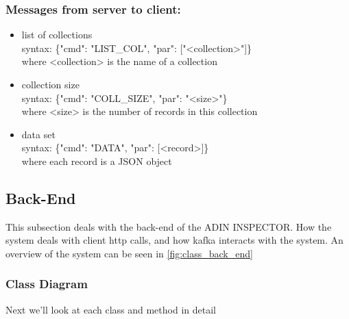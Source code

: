 \documentclass[oneside, english, final]{design}
\begin{document}
\subsubsection{Messages from server to client:}
\begin{itemize}
	\item{list of collections}
	      \\
	      syntax: \{"cmd": "LIST\_COL", "par": ["<collection>"]\} \\
	      where <collection> is the name of a collection\\

	\item{collection size}
	      \\
	      syntax: \{"cmd": "COLL\_SIZE", "par": "<size>"\} \\
	      where <size> is the number of records in this collection\\
	\item{data set}
	      \\
	      syntax: \{"cmd": "DATA", "par": [<record>]\} \\
	      where each record is a JSON object
\end{itemize}

\subsection{Back-End}
This subsection deals with the back-end of the ADIN INSPECTOR. How the system deals with client http calls, and how kafka interacts with the system.
An overview of the system can be seen in \autoref{fig:class_back_end}

\subsubsection{Class Diagram}
Next we'll look at each class and method in detail
\end{document}
